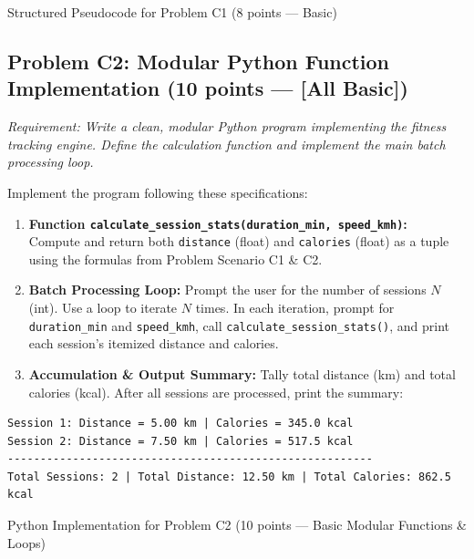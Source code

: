 \documentclass[11pt,a4paper]{article}
\begin{document}
\begin{answerbox}[height=5.2cm]{Structured Pseudocode for Problem C1 (8 points --- Basic)}
\end{answerbox}

\newpage


\subsection*{Problem C2: Modular Python Function Implementation (10 points --- [All Basic])}
\textit{Requirement: Write a clean, modular Python program implementing the fitness tracking engine. Define the calculation function and implement the main batch processing loop.}

Implement the program following these specifications:
\begin{enumerate}[label=\arabic*.,leftmargin=1.8em,itemsep=0.5pt]
  \item \textbf{Function \texttt{calculate\_session\_stats(duration\_min, speed\_kmh)}:}\\
    Compute and return both \texttt{distance} (float) and \texttt{calories} (float) as a tuple using the formulas from Problem Scenario C1 \& C2.
  \item \textbf{Batch Processing Loop:}
    Prompt the user for the number of sessions $N$ (int). Use a loop to iterate $N$ times. In each iteration, prompt for \texttt{duration\_min} and \texttt{speed\_kmh}, call \texttt{calculate\_session\_stats()}, and print each session's itemized distance and calories.
  \item \textbf{Accumulation \& Output Summary:}
    Tally total distance (km) and total calories (kcal). After all sessions are processed, print the summary:
\end{enumerate}

\begin{lstlisting}[basicstyle=\ttfamily\scriptsize]
Session 1: Distance = 5.00 km | Calories = 345.0 kcal
Session 2: Distance = 7.50 km | Calories = 517.5 kcal
--------------------------------------------------------
Total Sessions: 2 | Total Distance: 12.50 km | Total Calories: 862.5 kcal
\end{lstlisting}

\vspace{0.8mm}
\begin{answerbox}[height=18.0cm]{Python Implementation for Problem C2 (10 points --- Basic Modular Functions \& Loops)}
\end{answerbox}
\end{document}
